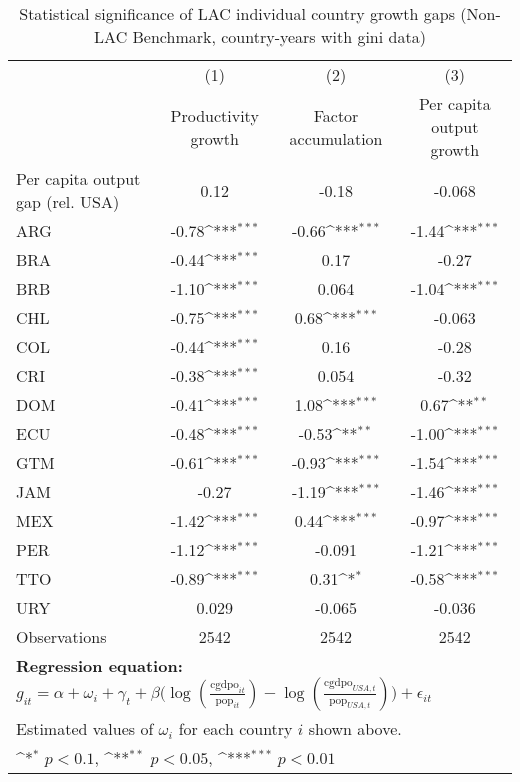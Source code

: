 \begin{table}[htbp]\centering
\def\sym#1{\ifmmode^{#1}\else\(^{#1}\)\fi}
\caption{Statistical significance of LAC individual country growth gaps (Non-LAC Benchmark, country-years with gini data)}
\begin{tabular}{l*{3}{c}}
\toprule
                &\multicolumn{1}{c}{(1)}&\multicolumn{1}{c}{(2)}&\multicolumn{1}{c}{(3)}\\
                &\multicolumn{1}{c}{Productivity growth}&\multicolumn{1}{c}{Factor accumulation}&\multicolumn{1}{c}{Per capita output growth}\\
\midrule
Per capita output gap (rel. USA)&     0.12         &    -0.18         &   -0.068         \\
ARG             &    -0.78\sym{***}&    -0.66\sym{***}&    -1.44\sym{***}\\
BRA             &    -0.44\sym{***}&     0.17         &    -0.27         \\
BRB             &    -1.10\sym{***}&    0.064         &    -1.04\sym{***}\\
CHL             &    -0.75\sym{***}&     0.68\sym{***}&   -0.063         \\
COL             &    -0.44\sym{***}&     0.16         &    -0.28         \\
CRI             &    -0.38\sym{***}&    0.054         &    -0.32         \\
DOM             &    -0.41\sym{***}&     1.08\sym{***}&     0.67\sym{**} \\
ECU             &    -0.48\sym{***}&    -0.53\sym{**} &    -1.00\sym{***}\\
GTM             &    -0.61\sym{***}&    -0.93\sym{***}&    -1.54\sym{***}\\
JAM             &    -0.27         &    -1.19\sym{***}&    -1.46\sym{***}\\
MEX             &    -1.42\sym{***}&     0.44\sym{***}&    -0.97\sym{***}\\
PER             &    -1.12\sym{***}&   -0.091         &    -1.21\sym{***}\\
TTO             &    -0.89\sym{***}&     0.31\sym{*}  &    -0.58\sym{***}\\
URY             &    0.029         &   -0.065         &   -0.036         \\
\midrule
Observations    &     2542         &     2542         &     2542         \\
\bottomrule
\multicolumn{4}{l}{\footnotesize \textbf{Regression equation:} \(g_{it} = \alpha  + \omega_i + \gamma_t + \beta \big(\log (\frac{\textrm{cgdpo}_{it}}{\textrm{pop}_{it}} ) - \log (\frac{\textrm{cgdpo}_{USA,t}}{\textrm{pop}_{USA,t}}  ) \big) + \epsilon_{it}\)}\\
\multicolumn{4}{l}{\footnotesize Estimated values of \(\omega_i\) for each country \(i\) shown above.}\\
\multicolumn{4}{l}{\footnotesize \sym{*} \(p<0.1\), \sym{**} \(p<0.05\), \sym{***} \(p<0.01\)}\\
\end{tabular}
\end{table}
